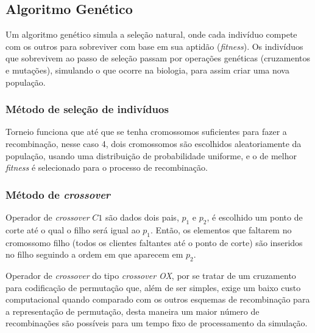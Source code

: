 \documentclass[conference]{IEEEtran}
\begin{document}


\subsection{Algoritmo Genético}
\label{sec:alg_genetic}



Um algoritmo genético simula a seleção natural, onde cada indivíduo compete com os outros para sobreviver com base em sua aptidão (\emph{fitness}). Os indivíduos que sobrevivem ao passo de
seleção passam por operações genéticas (cruzamentos e mutações), simulando o que ocorre na biologia, para assim criar uma nova população.

    \subsubsection{Método de seleção de indivíduos}

        Torneio funciona que até que se tenha cromossomos suficientes para fazer a recombinação, nesse caso 4, dois cromossomos são escolhidos aleatoriamente da população, usando uma distribuição de
        probabilidade uniforme, e o de melhor \textit{fitness} é selecionado para o processo de recombinação.

    \subsubsection{Método de \textit{crossover}}

        Operador de \textit{crossover} $C1$ são dados dois pais, $p_1$ e $p_2$, é escolhido um ponto de corte até o qual o filho será igual ao $p_1$. Então, os elementos que faltarem no
        cromossomo filho (todos os clientes faltantes até o ponto de corte) são inseridos no filho seguindo a ordem em que aparecem em $p_2$. 

        Operador de \textit{crossover} do tipo \emph{crossover OX}, por se tratar de um cruzamento para codificação de permutação que, além de ser simples, exige um baixo custo computacional
        quando comparado com os outros esquemas de recombinação para a representação de permutação, desta maneira um maior número de recombinações são possíveis para um tempo fixo de processamento
        da simulação. 
\end{document}
